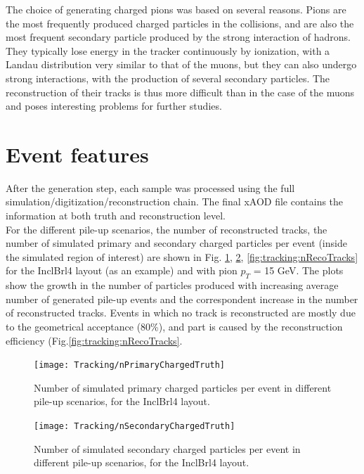 \documentclass[a4paper,twoside,12pt]{book}
\begin{document}
The choice of generating charged pions was based on several reasons. Pions are the most frequently
produced charged particles in the collisions, and are also the most frequent secondary particle produced by the strong interaction of hadrons. They typically lose energy in the tracker continuously by ionization, with a Landau distribution very similar to that of the muons, but they can also undergo strong interactions, with the production of several secondary particles. The reconstruction of their tracks
is thus more difficult than in the case of the muons and poses interesting problems for further studies.

\section{Event features}\label{subsec:tracking:eventFeatures}
After the generation step, each sample was processed using the full simulation/digitization/reconstruction chain. The final xAOD file contains the information at both
truth and reconstruction level. \\

For the different pile-up scenarios, the number of reconstructed tracks, the number of simulated primary and secondary charged particles per event
(inside the simulated region of interest) are shown in Fig. \ref{fig:tracking:nPrimaryChargedTruth}, \ref{fig:tracking:nSecondaryChargedTruth}, \ref{fig:tracking:nRecoTracks} for the InclBrl4 layout (as an example) and with pion $p_{T}$ = 15 GeV. The plots show the growth in the number of particles produced with increasing average number of generated pile-up events and
the correspondent increase in the number of reconstructed tracks. Events in which no track is reconstructed are mostly due to the geometrical acceptance (80\%), and part is caused by the reconstruction efficiency (Fig.\ref{fig:tracking:nRecoTracks}. \\

\begin{figure}
\centering
\texttt{[image: Tracking/nPrimaryChargedTruth]}
\caption{Number of simulated primary charged particles per event in different pile-up scenarios, for the InclBrl4 layout.}
\label{fig:tracking:nPrimaryChargedTruth}
\end{figure}

\begin{figure}
\centering
\texttt{[image: Tracking/nSecondaryChargedTruth]}
\caption{Number of simulated secondary charged particles per event in different pile-up scenarios, for the InclBrl4 layout.}
\label{fig:tracking:nSecondaryChargedTruth}
\end{figure}
\end{document}
